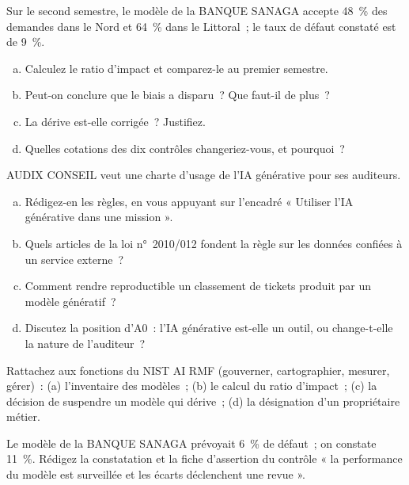 \begin{boxexo}[title={\ding{45}\quad Exercice~28.2. Biais et dérive \niveaumoyen}]
Sur le second semestre, le modèle de la BANQUE SANAGA accepte 48~\% des
demandes dans le Nord et 64~\% dans le Littoral~; le taux de défaut
constaté est de 9~\%.
\begin{enumerate}[(a)]
    \item Calculez le ratio d'impact et comparez-le au premier semestre.
    \item Peut-on conclure que le biais a disparu~? Que faut-il de plus~?
    \item La dérive est-elle corrigée~? Justifiez.
    \item Quelles cotations des dix contrôles changeriez-vous, et pourquoi~?
\end{enumerate}
\end{boxexo}

\begin{boxexo}[title={\ding{45}\quad Exercice~28.3. Une charte d'usage de l'IA générative \niveauexpert}]
AUDIX CONSEIL veut une charte d'usage de l'IA générative pour ses
auditeurs.
\begin{enumerate}[(a)]
    \item Rédigez-en les règles, en vous appuyant sur l'encadré « Utiliser
          l'IA générative dans une mission ».
    \item Quels articles de la loi n°~2010/012 fondent la règle sur les
          données confiées à un service externe~?
    \item Comment rendre reproductible un classement de tickets produit par
          un modèle génératif~?
    \item Discutez la position d'A0~: l'IA générative est-elle un outil, ou
          change-t-elle la nature de l'auditeur~?
\end{enumerate}
\end{boxexo}

\bigskip

\begin{boxexo}[title={\ding{45}\quad Exercice~28.4. Les fonctions de l'AI RMF \niveaubase}]
Rattachez aux fonctions du NIST AI RMF (gouverner, cartographier, mesurer,
gérer)~: (a) l'inventaire des modèles~; (b) le calcul du ratio d'impact~;
(c) la décision de suspendre un modèle qui dérive~; (d) la désignation d'un
propriétaire métier.
\end{boxexo}

\begin{boxexo}[title={\ding{45}\quad Exercice~28.5. La dérive \niveaumoyen}]
Le modèle de la BANQUE SANAGA prévoyait 6~\% de défaut~; on constate
11~\%. Rédigez la constatation et la fiche d'assertion du contrôle « la
performance du modèle est surveillée et les écarts déclenchent une
revue ».
\end{boxexo}

